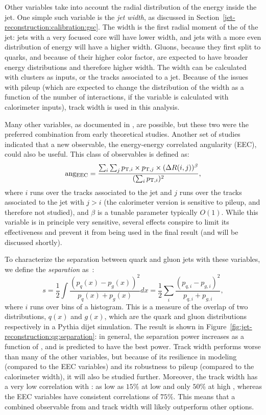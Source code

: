 Other variables take into account the radial distribution of the energy inside the jet. One simple such variable is the \textit{jet width}, as discussed in Section~\ref{jet-reconstruction:calibration:gsc}. The width is the first radial moment of the \pt of the jet: jets with a very focused core will have lower width, and jets with a more even distribution of energy will have a higher width. Gluons, because they first split to quarks, and because of their higher color factor, are expected to have broader energy distributions and therefore higher width. The width can be calculated with clusters as inputs, or the tracks associated to a jet. Because of the issues with pileup (which are expected to change the distribution of the width as a function of the number of interactions, if the variable is calculated with calorimeter inputs), track width is used in this analysis.

Many other variables, as documented in \cite{schwartz1}, are possible, but these two were the preferred combination from early theoretical studies. Another set of studies~\cite{EEC} indicated that a new observable, the energy-energy correlated angularity (EEC), could also be useful. This class of observables is defined as:
\begin{equation}
{\rm ang_{\rm EEC}}=\frac{ \sum_i \sum_j p_{{\rm T},i} \times p_{{\rm T},j} \times (\Delta R(i,j))^\beta}{ (\sum_i p_{{\rm T},i})^2 },
\end{equation}
where $i$ runs over the tracks associated to the jet and $j$ runs over the tracks associated to the jet with $j>i$ (the calorimeter version is sensitive to pileup, and therefore not studied), and $\beta$ is a tunable parameter typically $O(1)$. While this variable is in principle very sensitive, several effects conspire to limit its effectiveness and prevent it from being used in the final result (and will be discussed shortly).

To characterize the separation between quark and gluon jets with these variables, we define the \textit{separation} as~\cite{2006physics11219P}:
%
\begin{equation}
s=\frac{1}{2}\int\frac{(p_q(x)-p_g(x))^2}{p_q(x)+p_g(x)}dx = \frac{1}{2}\sum_i\frac{(p_{q,i}-p_{g,i})^2}{p_{q,i}+p_{g,i}}, 
\label{eq:separation}
\end{equation}
%
where $i$ runs over bins of a histogram. This is a measure of the overlap of two distributions, $q(x)$ and $g(x)$, which are the quark and gluon distributions respectively in a Pythia dijet simulation.  The result is shown in Figure~\ref{fig:jet-reconstruction:qg:separation}: in general, the separation power increases as a function of \pt, and \ntrk is predicted to have the best power. Track width performs worse than many of the other variables, but because of its resilience in modeling (compared to the EEC variables) and its robustness to pileup (compared to the calorimeter width), it will also be studied further. Moreover, the track width has a very low correlation with \ntrk: as low as $15\%$ at low \pt and only $50\%$ at high \pt, whereas the EEC variables have consistent correlations of $75\%$. This means that a combined observable from \ntrk and track width will likely outperform other options.

